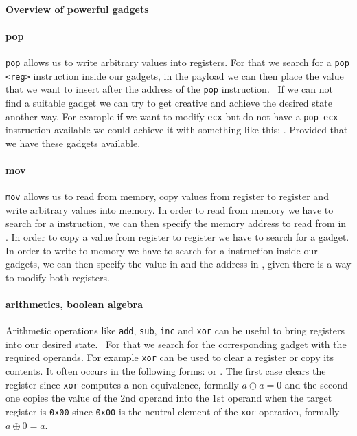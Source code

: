 \documentclass[journal=tosc,submission, notanonymous]{iacrtrans}
\begin{document}
\paragraph{Overview of powerful gadgets}
\paragraph{pop}
\Verb+pop+ allows us to write arbitrary values into registers. For that we search for a \Verb+pop <reg>+ instruction inside our gadgets, in the payload we can then place the value that we want to insert after the address of the \Verb+pop+ instruction.~\cite{ropsla} If we can not find a suitable gadget we can try to get creative and achieve the desired state another way. For example if we want to modify \Verb+ecx+ but do not have a \Verb+pop ecx+ instruction available we could achieve it with something like this: . Provided that we have these gadgets available.
\paragraph{mov}
\Verb+mov+ allows us to read from memory, copy values from register to register and write arbitrary values into memory. In order to read from memory we have to search for a  instruction, we can then specify the memory address to read from in . In order to copy a value from register to register we have to search for a  gadget. In order to write to memory we have to search for a  instruction inside our gadgets, we can then specify the value in  and the address in , given there is a way to modify both registers.
\paragraph{arithmetics, boolean algebra}
Arithmetic operations like \Verb+add+, \Verb+sub+, \Verb+inc+ and \Verb+xor+ can be useful to bring registers into our desired state.~\cite{ropsla} For that we search for the corresponding gadget with the required operands. For example \Verb+xor+ can be used to clear a register or copy its contents. It often occurs in the following forms:  or . The first case clears the register since \Verb+xor+ computes a non-equivalence, formally $a \oplus a = 0$ and the second one copies the value of the 2nd operand into the 1st operand when the target register is \Verb+0x00+ since \Verb+0x00+ is the neutral element of the \Verb+xor+ operation, formally $a \oplus 0 = a$.
\end{document}
